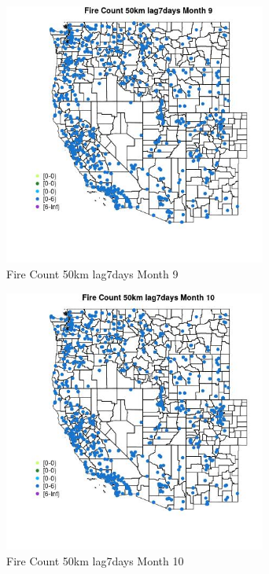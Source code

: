 \begin{figure} 
\centering  
\includegraphics[width=0.77\textwidth]{Code_Outputs/Report_ML_input_PM25_Step4_part_e_de_duplicated_aves_compiled_2019-05-21wNAs_MapObsMo9Fire_Count_50km_lag7days.jpg} 
\caption{\label{fig:Report_ML_input_PM25_Step4_part_e_de_duplicated_aves_compiled_2019-05-21wNAsMapObsMo9Fire_Count_50km_lag7days}Fire Count 50km lag7days Month 9} 
\end{figure} 
 

\clearpage 

\begin{figure} 
\centering  
\includegraphics[width=0.77\textwidth]{Code_Outputs/Report_ML_input_PM25_Step4_part_e_de_duplicated_aves_compiled_2019-05-21wNAs_MapObsMo10Fire_Count_50km_lag7days.jpg} 
\caption{\label{fig:Report_ML_input_PM25_Step4_part_e_de_duplicated_aves_compiled_2019-05-21wNAsMapObsMo10Fire_Count_50km_lag7days}Fire Count 50km lag7days Month 10} 
\end{figure} 
 

